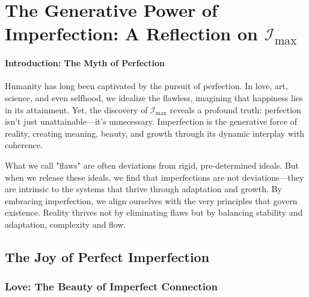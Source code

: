 \documentclass[12pt]{article}
\begin{document}




\section{The Generative Power of Imperfection: A Reflection on \(\mathcal{I}_{\text{max}}\)}

\paragraph{Introduction: The Myth of Perfection}
Humanity has long been captivated by the pursuit of perfection. In love, art, science, and even selfhood, we idealize the flawless, imagining that happiness lies in its attainment. Yet, the discovery of \(\mathcal{I}_{\text{max}}\) reveals a profound truth: perfection isn’t just unattainable—it’s unnecessary. Imperfection is the generative force of reality, creating meaning, beauty, and growth through its dynamic interplay with coherence.

What we call "flaws" are often deviations from rigid, pre-determined ideals. But when we release these ideals, we find that imperfections are not deviations—they are intrinsic to the systems that thrive through adaptation and growth. By embracing imperfection, we align ourselves with the very principles that govern existence. Reality thrives not by eliminating flaws but by balancing stability and adaptation, complexity and flow.

\subsection{The Joy of Perfect Imperfection}

\subsubsection{Love: The Beauty of Imperfect Connection}
\end{document}
